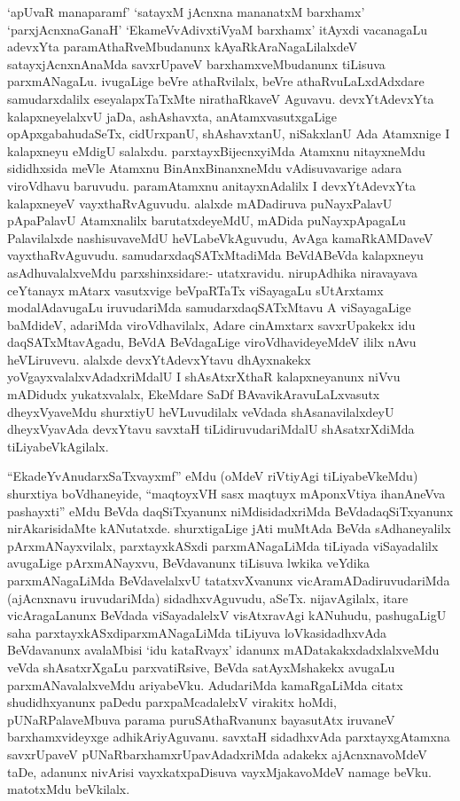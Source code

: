 \begin{artha}
`apUvaR manaparamf' `satayxM jAcnxna mananatxM barxhamx' `parxjAcnxnaGanaH' `EkameVvAdivxtiVyaM barxhamx' itAyxdi vacanagaLu adevxYta paramAthaRveMbudanunx kAyaRkAraNagaLilalxdeV satayxjAcnxnAnaMda savxrUpaveV barxhamxveMbudanunx tiLisuva parxmANagaLu. ivugaLige beVre athaRvilalx, beVre athaRvuLaLxdAdxdare samudarxdalilx eseyalapxTaTxMte nirathaRkaveV Aguvavu. devxYtAdevxYta kalapxneyelalxvU jaDa, ashAshavxta, anAtamxvasutxgaLige opApxgabahudaSeTx, cidUrxpanU, shAshavxtanU, niSakxlanU Ada Atamxnige I kalapxneyu eMdigU salalxdu. parxtayxBijecnxyiMda Atamxnu nitayxneMdu sididhxsida meVle Atamxnu BinAnxBinanxneMdu vAdisuvavarige adara viroVdhavu baruvudu. paramAtamxnu anitayxnAdalilx I devxYtAdevxYta kalapxneyeV vayxthaRvAguvudu. alalxde mADadiruva puNayxPalavU pApaPalavU Atamxnalilx barutatxdeyeMdU, mADida puNayxpApagaLu Palavilalxde nashisuvaveMdU heVLabeVkAguvudu, AvAga kamaRkAMDaveV vayxthaRvAguvudu. samudarxdaqSATxMtadiMda BeVdABeVda kalapxneyu asAdhuvalalxveMdu parxshinxsidare:- utatxravidu. nirupAdhika niravayava ceYtanayx mAtarx vasutxvige beVpaRTaTx viSayagaLu sUtArxtamx modalAdavugaLu iruvudariMda samudarxdaqSATxMtavu A viSayagaLige baMdideV, adariMda viroVdhavilalx, Adare cinAmxtarx savxrUpakekx idu daqSATxMtavAgadu, BeVdA BeVdagaLige viroVdhavideyeMdeV ililx nAvu heVLiruvevu. alalxde devxYtAdevxYtavu dhAyxnakekx yoVgayxvalalxvAdadxriMdalU I shAsAtxrXthaR kalapxneyanunx niVvu mADidudx yukatxvalalx, EkeMdare SaDf BAvavikAravuLaLxvasutx dheyxVyaveMdu shurxtiyU heVLuvudilalx veVdada shAsanavilalxdeyU dheyxVyavAda devxYtavu savxtaH tiLidiruvudariMdalU shAsatxrXdiMda tiLiyabeVkAgilalx.
\end{artha}

\begin{artha}
``EkadeYvAnudarxSaTxvayxmf'' eMdu (oMdeV riVtiyAgi tiLiyabeVkeMdu) shurxtiya boVdhaneyide, ``maqtoyxVH sasx maqtuyx mAponxVtiya ihanAneVva pashayxti'' eMdu BeVda daqSiTxyanunx niMdisidadxriMda BeVdadaqSiTxyanunx nirAkarisidaMte kANutatxde. shurxtigaLige jAti muMtAda BeVda sAdhaneyalilx pArxmANayxvilalx, parxtayxkASxdi parxmANagaLiMda tiLiyada viSayadalilx avugaLige pArxmANayxvu, BeVdavanunx tiLisuva lwkika veYdika parxmANagaLiMda BeVdavelalxvU tatatxvXvanunx vicAramADadiruvudariMda (ajAcnxnavu iruvudariMda) sidadhxvAguvudu, aSeTx. nijavAgilalx, itare vicAragaLanunx BeVdada viSayadalelxV visAtxravAgi kANuhudu, pashugaLigU saha parxtayxkASxdiparxmANagaLiMda tiLiyuva loVkasidadhxvAda BeVdavanunx avalaMbisi `idu kataRvayx' idanunx mADatakakxdadxlalxveMdu veVda shAsatxrXgaLu parxvatiRsive, BeVda satAyxMshakekx avugaLu parxmANavalalxveMdu ariyabeVku. AdudariMda kamaRgaLiMda citatx shudidhxyanunx paDedu parxpaMcadalelxV virakitx hoMdi, pUNaRPalaveMbuva parama puruSAthaRvanunx bayasutAtx iruvaneV barxhamxvideyxge adhikAriyAguvanu. savxtaH sidadhxvAda parxtayxgAtamxna savxrUpaveV pUNaRbarxhamxrUpavAdadxriMda adakekx ajAcnxnavoMdeV taDe, adanunx nivArisi vayxkatxpaDisuva vayxMjakavoMdeV namage beVku. matotxMdu beVkilalx.
\end{artha}

